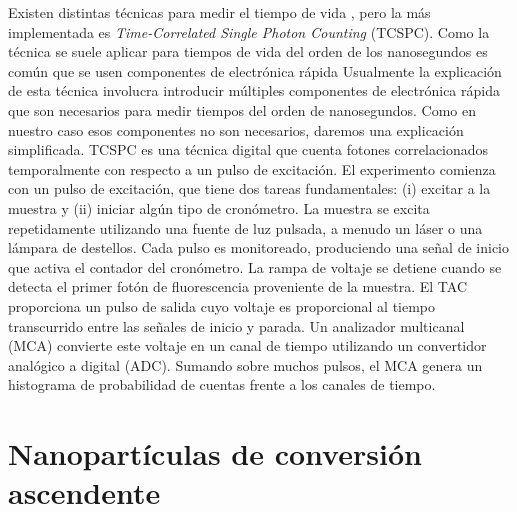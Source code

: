 Existen distintas técnicas para medir el tiempo de vida \cite{becker_fluorescence_2012}, pero la más implementada es \textit{Time-Correlated Single Photon Counting} (TCSPC).
Como la técnica se suele aplicar para tiempos de vida del orden de los nanosegundos es común que se usen componentes de electrónica rápida 
Usualmente la explicación de esta técnica involucra introducir múltiples componentes de electrónica rápida que son necesarios para medir tiempos del orden de nanosegundos.
Como en nuestro caso esos componentes no son necesarios, daremos una explicación simplificada.
TCSPC es una técnica digital que cuenta fotones correlacionados temporalmente con respecto a un pulso de excitación.
El experimento comienza con un pulso de excitación, que tiene dos tareas fundamentales: (i) excitar a la muestra y (ii) iniciar algún tipo de cronómetro.
La muestra se excita repetidamente utilizando una fuente de luz pulsada, a menudo un láser o una lámpara de destellos.
Cada pulso es monitoreado, produciendo una señal de inicio que activa el contador del cronómetro.
La rampa de voltaje se detiene cuando se detecta el primer fotón de fluorescencia proveniente de la muestra.
El TAC proporciona un pulso de salida cuyo voltaje es proporcional al tiempo transcurrido entre las señales de inicio y parada.
Un analizador multicanal (MCA) convierte este voltaje en un canal de tiempo utilizando un convertidor analógico a digital (ADC).
Sumando sobre muchos pulsos, el MCA genera un histograma de probabilidad de cuentas frente a los canales de tiempo.

\section{Nanopartículas de conversión ascendente} \label{sec:intro_ucnp}